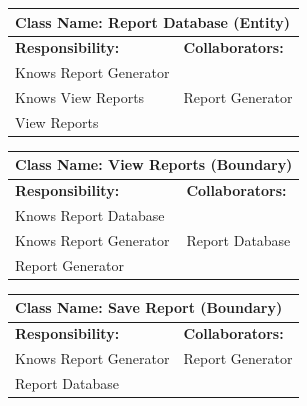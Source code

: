 \documentclass[]{article}
\begin{document}
	\begin{table}[H]
		\centering
		\begin{tabular}{|p{7cm}|p{7cm}|}
		\hline 
		 \multicolumn{2}{|l|}{\textbf{Class Name: Report Database (Entity)}} \\
		\hline
		\textbf{Responsibility:} & \textbf{Collaborators:} \\
		\hline
		Knows Report Generator \\
		Knows View Reports & 		
		Report Generator \\
		View Reports \\
		\hline
		\end{tabular}
	\end{table}
	
	\begin{table}[H]
		\centering
		\begin{tabular}{|p{7cm}|p{7cm}|}
		\hline 
		 \multicolumn{2}{|l|}{\textbf{Class Name: View Reports (Boundary)}} \\
		\hline
		\textbf{Responsibility:} & \textbf{Collaborators:} \\
		\hline
		Knows Report Database \\
		Knows Report Generator & 		
		Report Database \\
		Report Generator \\
		\hline
		\end{tabular}
	\end{table} 	
	
	\begin{table}[H]
		\centering
		\begin{tabular}{|p{7cm}|p{7cm}|}
		\hline 
		 \multicolumn{2}{|l|}{\textbf{Class Name: Save Report (Boundary)}} \\
		\hline
		\textbf{Responsibility:} & \textbf{Collaborators:} \\
		\hline
		Knows Report Generator & 		
		Report Generator \\
		Report Database \\
		\hline
		\end{tabular}
	\end{table}
\end{document}
